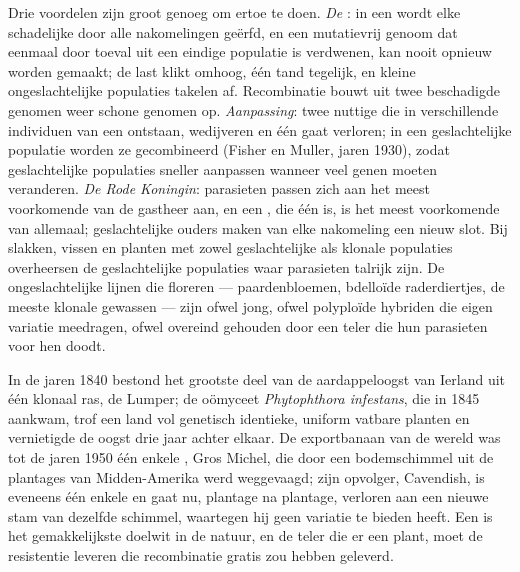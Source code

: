 \begin{proposition}\label{prop:b2:asexual-reproduction:whysex}
Drie voordelen zijn groot genoeg om ertoe te doen. \emph{De }: in een  wordt elke schadelijke  door alle
nakomelingen geërfd, en een mutatievrij genoom dat eenmaal door toeval uit
een eindige populatie is verdwenen, kan nooit opnieuw worden gemaakt; de
last klikt omhoog, één tand tegelijk, en kleine ongeslachtelijke populaties
takelen af. Recombinatie bouwt uit twee beschadigde genomen weer schone
genomen op. \emph{Aanpassing}: twee nuttige  die in verschillende
individuen van een  ontstaan, wedijveren en één gaat verloren; in een
geslachtelijke populatie worden ze gecombineerd (Fisher en Muller, jaren
1930), zodat geslachtelijke populaties sneller aanpassen wanneer veel genen
moeten veranderen. \emph{De Rode Koningin}: parasieten passen zich aan het
meest voorkomende  van de gastheer aan, en een , die één
 is, is het meest voorkomende van allemaal; geslachtelijke ouders
maken van elke nakomeling een nieuw slot. Bij slakken, vissen en planten
met zowel geslachtelijke als klonale populaties overheersen de
geslachtelijke populaties waar parasieten talrijk zijn. De ongeslachtelijke
lijnen die floreren --- paardenbloemen, bdelloïde raderdiertjes, de meeste
klonale gewassen --- zijn ofwel jong, ofwel polyploïde hybriden die eigen
variatie meedragen, ofwel overeind gehouden door een teler die hun
parasieten voor hen doodt.
\end{proposition}

\begin{example}\label{ex:b2:asexual-reproduction:monoculture}
In de jaren 1840 bestond het grootste deel van de aardappeloogst van
Ierland uit één klonaal ras, de Lumper; de oömyceet \emph{Phytophthora
infestans}, die in 1845 aankwam, trof een land vol genetisch identieke,
uniform vatbare planten en vernietigde de oogst drie jaar achter elkaar.
De exportbanaan van de wereld was tot de jaren 1950 één enkele , Gros
Michel, die door een bodemschimmel uit de plantages van Midden-Amerika werd
weggevaagd; zijn opvolger, Cavendish, is eveneens één enkele  en gaat
nu, plantage na plantage, verloren aan een nieuwe stam van dezelfde
schimmel, waartegen hij geen variatie te bieden heeft. Een  is het
gemakkelijkste doelwit in de natuur, en de teler die er een plant, moet
de resistentie leveren die recombinatie gratis zou hebben geleverd.
\end{example}

